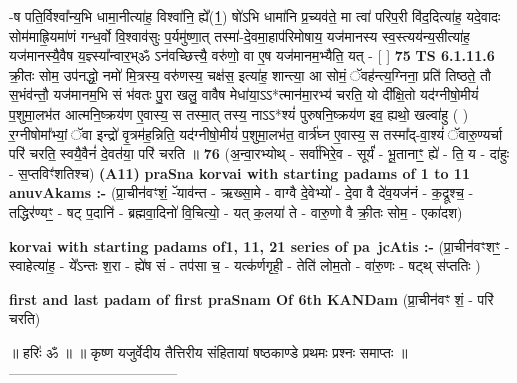 \documentclass[17pt]{extarticle}
\begin{document}
                  -ष पति॒र्विश्वा᳚न्य॒भि धामा॒नीत्या॑ह॒ विश्वा॑नि॒ ह्ये᳚(1॒) षो॑ऽभि धामा॑नि प्र॒च्यव॑ते॒ मा त्वा॑ परिप॒री वि॑द॒दित्या॑ह॒ यदे॒वादः सोम॑माह्रि॒यमा॑णं गन्ध॒र्वो वि॒श्वाव॑सुः प॒र्यमु॑ष्णा॒त् तस्मा॑-दे॒वमा॒हाप॑रिमोषाय॒ यज॑मानस्य स्व॒स्त्यय॑न्य॒सीत्या॑ह॒ यज॑मानस्यै॒वैष य॒ज्ञ्स्या᳚न्वार॒भ्ॐ ऽन॑वच्छित्त्यै॒ वरु॑णो॒ वा ए॒ष यज॑मानम॒भ्यैति॒ यत् - [  ] \textbf{  75} \newline
                  \newline
                                \textbf{ TS 6.1.11.6} \newline
                  क्री॒तः सोम॒ उप॑नद्धो॒ नमो॑ मि॒त्रस्य॒ वरु॑णस्य॒ चक्ष॑स॒ इत्या॑ह॒ शान्त्या॒ आ सोमं॒ ॅवह॑न्त्य॒ग्निना॒ प्रति॑ तिष्ठते॒ तौ स॒भंव॑न्तौ॒ यज॑मानम॒भि सं भ॑वतः पु॒रा खलु॒ वावैष मेधा॑या॒ऽऽ*त्मान॑मा॒रभ्य॑ चरति॒ यो दी᳚क्षि॒तो यद॑ग्नीषो॒मीयं॑ प॒शुमा॒लभ॑त आत्मनि॒ष्क्रय॑ण ए॒वास्य॒ स तस्मा॒त् तस्य॒ नाऽऽ*श्यं॑ पुरुषनि॒ष्क्रय॑ण इव॒ ह्यथो॒ खल्वा॑हु ( ) र॒ग्नीषोमा᳚भ्यां॒ ॅवा इन्द्रो॑ वृ॒त्रम॑ह॒न्निति॒ यद॑ग्नीषो॒मीयं॑ प॒शुमा॒लभ॑त॒ वार्त्र॑घ्न ए॒वास्य॒ स तस्मा᳚द्-वा॒श्यं॑ ॅवारु॒ण्यर्चा परि॑ चरति॒ स्वयै॒वैनं॑ दे॒वत॑या॒ परि॑ चरति ॥ \textbf{  76} \newline
                  \newline
                      (अ॒न्वा॒रभ्योथ् - सर्वा॑भिरे॒व - सूर्यं॑ - भू॒तानाꣳ॒॒ ह्ये॑ - ति॒ य - दा॑हुः - स॒प्तविꣳ॑शतिश्च)  \textbf{(A11)} \newline \newline
                \textbf{praSna korvai with starting padams of 1 to 11 anuvAkams :-} \newline
        (प्रा॒चीन॑वꣳशं॒ -ॅयाव॑न्त - ऋख्सा॒मे - वाग्वै दे॒वेभ्यो॑ - दे॒वा वै दे॑व॒यज॑नं - क॒द्रूश्च॒ - तद्धिर॑ण्यꣳ॒॒ - षट् प॒दानि॑ - ब्रह्मवा॒दिनो॑ वि॒चित्यो॒ - यत् क॒लया॑ ते - वारु॒णो वै क्री॒तः सोम॒ - एका॑दश) \newline

        \textbf{korvai with starting padams of1, 11, 21 series of pa~jcAtis :-} \newline
        (प्रा॒चीन॑वꣳशꣳ॒॒ - स्वाहेत्या॑ह॒ - ये᳚ऽन्तः श॒रा - ह्ये॑ष सं - तप॑सा च॒ - यत्क॑र्णगृही॒ - तेति॑ लोम॒तो - वा॑रु॒णः - षट्थ् स॑प्ततिः ) \newline

        \textbf{first and last padam of first praSnam Of 6th KANDam} \newline
        (प्रा॒चीन॑वꣳ शं॒ - परि॑ चरति) \newline 

        
        ॥ हरिः॑ ॐ ॥
॥ कृष्ण यजुर्वेदीय तैत्तिरीय संहितायां षष्ठकाण्डे प्रथमः प्रश्नः समाप्तः ॥
------------------------------------ \newline
        \pagebreak
                \pagebreak
        
\end{document}
